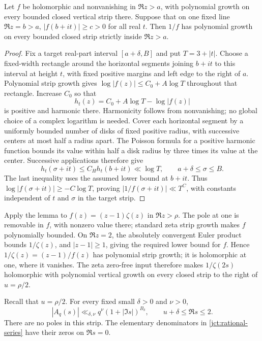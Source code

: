 \begin{lemma}
\label{jct:reciprocal-growth}
Let \(f\) be holomorphic and nonvanishing in \(\Re z>a\), with
polynomial growth on every bounded closed vertical strip there.
Suppose that on one fixed line \(\Re z=b>a\),
\(|f(b+it)|\ge c>0\) for all real \(t\). Then \(1/f\) has
polynomial growth on every bounded closed strip strictly inside
\(\Re z>a\).
\end{lemma}
\begin{proof}
Fix a target real-part interval \([a+\delta,B]\) and put
\(T=3+|t|\). Choose a fixed-width rectangle around the horizontal
segments joining \(b+it\) to this interval at height \(t\),
with fixed positive margins and left edge to the right of \(a\).
Polynomial strip growth gives
\(\log|f(z)|\le C_0+A\log T\) throughout that rectangle.
Increase \(C_0\) so that
\[
 h_t(z)=C_0+A\log T-\log|f(z)|
\]
is positive and harmonic there. Harmonicity follows from
nonvanishing; no global choice of a complex logarithm is needed.
Cover each horizontal segment by a uniformly bounded number of
disks of fixed positive radius, with successive centers at most
half a radius apart. The Poisson formula for a positive harmonic
function bounds its value within half a disk radius by three times
its value at the center. Successive applications therefore give
\[
 h_t(\sigma+it)\le C_Hh_t(b+it)\ll\log T,
 \qquad a+\delta\le\sigma\le B.
\]
The last inequality uses the assumed lower bound at \(b+it\).
Thus \(\log|f(\sigma+it)|\ge-C\log T\), proving
\(|1/f(\sigma+it)|\ll T^C\), with constants independent of
\(t\) and \(\sigma\) in the target strip.
\end{proof}

Apply the lemma to \(f(z)=(z-1)\zeta(z)\) in \(\Re z>\rho\).
The pole at one is removable in \(f\), with nonzero value there;
standard zeta strip growth makes \(f\) polynomially bounded.
On \(\Re z=2\), the absolutely convergent Euler product bounds
\(1/\zeta(z)\), and \(|z-1|\ge1\), giving the required lower
bound for \(f\). Hence
\(1/\zeta(z)=(z-1)/f(z)\) has polynomial strip growth; it is
holomorphic at one, where it vanishes. The zeta zero-free input
therefore makes \(1/\zeta(2s)\) holomorphic with polynomial
vertical growth on every closed strip to the right of \(u=\rho/2\).

Recall that \(u=\rho/2\).
For every fixed small \(\delta>0\) and \(\nu>0\),
\begin{equation}
 |A_q(s)|\ll_{\delta,\nu}q^\nu(1+|\Im s|)^{B_\delta},
 \qquad u+\delta\le\Re s\le2.
 \label{jct:series-strip}
\end{equation}
There are no poles in this strip.  The elementary denominators
in \eqref{jct:rational-series} have their zeros on \(\Re s=0\).

